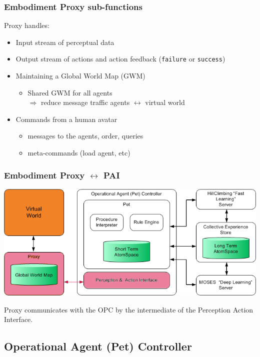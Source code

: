 \documentclass{beamer}
\begin{document}
\frame
{
  \frametitle{Embodiment Proxy sub-functions}

  Proxy handles:
  \begin{itemize}
  \item<+-> Input stream of \alert{perceptual data}
  \item<+-> Output stream of \alert{actions and action feedback}
    ({\tt failure} or {\tt success})
 \item<+-> Maintaining a Global World Map (GWM)
   \begin{itemize}
   \item Shared GWM for all agents\\ $\Rightarrow$ reduce message traffic
     agents $\leftrightarrow$ virtual world
   \end{itemize}
  \item<+-> Commands from a human avatar
    \begin{itemize}
    \item messages to the agents, order, queries
    \item meta-commands (load agent, etc)
    \end{itemize}
  \end{itemize}
}

\frame
{
  \frametitle{Embodiment Proxy $\leftrightarrow$ PAI}
  \begin{center}
  \includegraphics[scale=0.3]{EmbodimentSystemArchitecture_Proxy_PAI.png}
  \end{center}
  
  Proxy communicates with the OPC by the intermediate of the
  \alert{Perception Action Interface}.

}

\subsection{Operational Agent (Pet) Controller}
\end{document}
